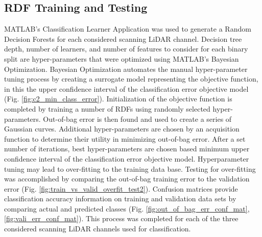 \documentclass[journal,onecolumn]{IEEEtran}
\begin{document}
		\subsection{RDF Training and Testing}
		
	
			{MATLAB's Classification Learner Application was used to generate a Random Decision Forests for each considered scanning LiDAR channel. Decision tree depth, number of learners, and number of features to consider for each binary split are hyper-parameters that were optimized using MATLAB's Bayesian Optimization. Bayesian Optimization automates the manual hyper-parameter tuning process by creating a surrogate model representing the objective function, in this the upper confidence interval of the classification error objective model (Fig. \ref{fig:c2_min_class_error}). Initialization of the objective function is completed by training a number of RDFs using randomly selected hyper-parameters. Out-of-bag error is then found and used to create a series of Gaussian curves. Additional hyper-parameters are chosen by an acquisition function to determine their utility in minimizing out-of-bag error. After a set number of iterations, best hyper-parameters are chosen based minimum upper confidence interval of the classification error objective model. Hyperparameter tuning may lead to over-fitting to the training data base. Testing for over-fitting was accomplished by comparing the out-of-bag training error to the validation error (Fig. \ref{fig:train_vs_valid_overfit_test2}). Confusion matrices provide classification accuracy information on training and validation data sets by comparing actual and predicted classes (Fig. \ref{fig:out_of_bag_err_conf_mat}, \ref{fig:vali_err_conf_mat}). This process was completed for each of the three considered scanning LiDAR channels used for classification.}
	
\end{document}
